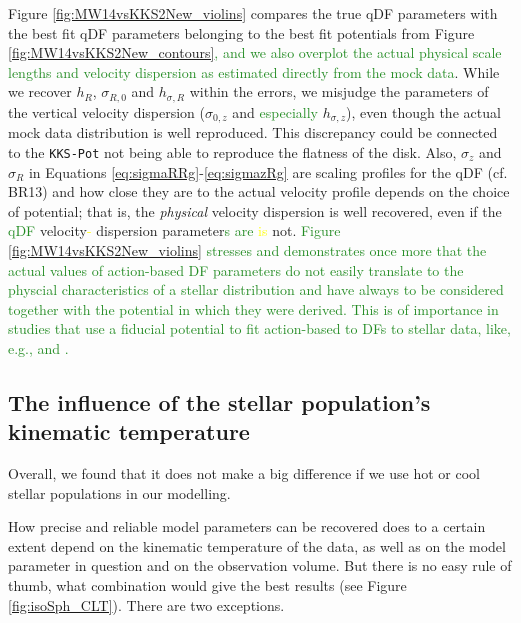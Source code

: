 \documentclass[iop,revtex4,numberedappendix,appendixfloats]{emulateapj}
\newcommand{\NEW}[1]{\textcolor{ForestGreen}{#1}}
\newcommand{\OLD}[1]{\textcolor{Yellow}{#1}}%
\begin{document}
Figure \ref{fig:MW14vsKKS2New_violins} compares the true qDF parameters with the best fit qDF parameters belonging to the best fit potentials from Figure \ref{fig:MW14vsKKS2New_contours}\NEW{, and we also overplot the actual physical scale lengths and velocity dispersion as estimated directly from the mock data}. While we recover $h_R$, $\sigma_{R,0}$ and $h_{\sigma,R}$ within the errors, we misjudge the parameters of the vertical velocity dispersion ($\sigma_{0,z}$ and \NEW{especially} $h_{\sigma,z}$), even though the actual mock data distribution is well reproduced. This discrepancy could be connected to the \texttt{KKS-Pot} not being able to reproduce the flatness of the disk. Also, $\sigma_z$ and $\sigma_R$ in Equations \eqref{eq:sigmaRRg}-\eqref{eq:sigmazRg} are scaling profiles for the qDF (cf. BR13) and how close they are to the actual velocity profile depends on the choice of potential; that is, the \emph{physical} velocity dispersion is well recovered, even if the \NEW{qDF} velocity\OLD{-} dispersion parameter\NEW{s are}\OLD{ is} not. \NEW{Figure \ref{fig:MW14vsKKS2New_violins} stresses and demonstrates once more that the actual values of action-based DF parameters do not easily translate to the physcial characteristics of a stellar distribution and have always to be considered together with the potential in which they were derived. This is of importance in studies that use a fiducial potential to fit action-based to DFs to stellar data, like, e.g., \citet{2015MNRAS.449.3479S} and \citet{2016arXiv160309332D}.}

\subsection{The influence of the stellar population's kinematic temperature} \label{sec:results_temperature}

Overall, we found that it does not make a big difference if we use hot or cool stellar populations in our modelling.

How precise and reliable model parameters can be recovered does to a certain extent depend on the kinematic temperature of the data, as well as on the model parameter in question and on the observation volume. But there is no easy rule of thumb, what combination would give the best results (see Figure \ref{fig:isoSph_CLT}). There are two exceptions.
\end{document}
